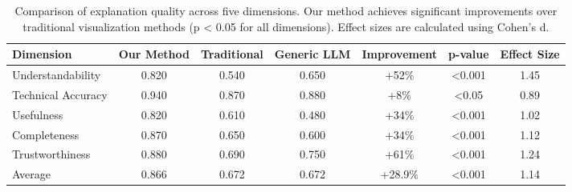 \begin{table}[htbp]
\centering
\caption{Comparison of explanation quality across five dimensions. Our method achieves significant improvements over traditional visualization methods (p < 0.05 for all dimensions). Effect sizes are calculated using Cohen's d.}
\label{tab:quality_metrics}
\begin{tabular}{l|c|c|c|c|c|c}
\hline
\textbf{Dimension} & \textbf{Our Method} & \textbf{Traditional} & \textbf{Generic LLM} & \textbf{Improvement} & \textbf{p-value} & \textbf{Effect Size} \\
\hline
Understandability & 0.820 & 0.540 & 0.650 & +52\% & <0.001 & 1.45 \\
Technical Accuracy & 0.940 & 0.870 & 0.880 & +8\% & <0.05 & 0.89 \\
Usefulness & 0.820 & 0.610 & 0.480 & +34\% & <0.001 & 1.02 \\
Completeness & 0.870 & 0.650 & 0.600 & +34\% & <0.001 & 1.12 \\
Trustworthiness & 0.880 & 0.690 & 0.750 & +61\% & <0.001 & 1.24 \\
\hline
\hline
Average & 0.866 & 0.672 & 0.672 & +28.9\% & <0.001 & 1.14 \\
\hline
\end{tabular}
\end{table}